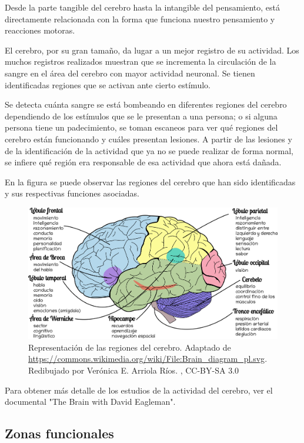 Desde la parte tangible del cerebro hasta la intangible del pensamiento, está directamente relacionada con la forma que funciona nuestro pensamiento y reacciones motoras.


El cerebro, por su gran tamaño, da lugar a un mejor registro de su actividad. Los muchos registros realizados muestran que se incrementa la circulación de la sangre en el área del cerebro con mayor actividad neuronal. Se tienen identificadas regiones que se activan ante cierto estímulo. \parencite{neurona_A_cerebro}


 Se detecta cuánta sangre se está bombeando en diferentes regiones del cerebro dependiendo de los estímulos que se le presentan a una persona; o si alguna persona tiene un padecimiento, se toman escaneos para ver qué regiones del cerebro están funcionando y cuáles presentan lesiones. A partir de las lesiones y de la identificación de la actividad que ya no se puede realizar de forma normal, se infiere qué región era responsable de esa actividad que ahora está dañada.\parencite{estudiosF}

 En la figura  se puede observar las regiones del cerebro que han sido identificadas y sus respectivas funciones asociadas.
 
 \begin{figure}[h]
  \centering
  \includegraphics[scale=0.4]{../Figuras/cerebro.png}
  \caption{Representación de las regiones del cerebro. Adaptado de \url{https://commons.wikimedia.org/wiki/File:Brain_diagram_pl.svg}. Redibujado por Verónica E. Arriola Ríos. , CC-BY-SA 3.0}
  \label{fig:cerebroFunciones}
 \end{figure}

Para obtener más detalle de los estudios de la actividad del cerebro, ver el documental "The Brain with David Eagleman".

\subsection{Zonas funcionales}


